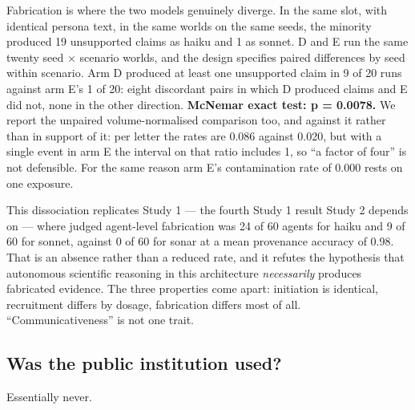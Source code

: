 \documentclass[pdflatex,sn-basic]{sn-jnl}
\begin{document}
Fabrication is where the two models genuinely diverge. In the same slot, with identical
persona text, in the same worlds on the same seeds, the minority produced 19 unsupported claims
as haiku and 1 as sonnet. D and E run the same twenty seed × scenario worlds, and the design
specifies paired differences by seed within scenario. Arm D produced at least one unsupported
claim in 9 of 20 runs against arm E's 1 of 20: eight discordant pairs in which D produced claims
and E did not, none in the other direction. \textbf{McNemar exact test: p = 0.0078.} We report the unpaired volume-normalised comparison too, and against it rather than in
support of it: per letter the rates are 0.086 against 0.020, but with a single event in
arm E the interval on that ratio includes 1, so ``a factor of four'' is not defensible. For
the same reason arm E's contamination rate of 0.000 rests on one exposure.

This dissociation replicates Study 1 --- the fourth Study 1 result Study 2 depends on --- where
judged agent-level fabrication was 24 of 60 agents for haiku and 9 of 60 for sonnet, against
0 of 60 for sonar at a mean provenance accuracy of 0.98. That is an absence rather than a reduced rate, and it refutes the hypothesis that
autonomous scientific reasoning in this architecture \emph{necessarily} produces fabricated
evidence. The three properties come apart: initiation is identical, recruitment differs by
dosage, fabrication differs most of all. ``Communicativeness'' is not one trait.

\hypertarget{was-the-public-institution-used}{%
\subsection{Was the public institution used?}\label{was-the-public-institution-used}}

Essentially never.
\end{document}

